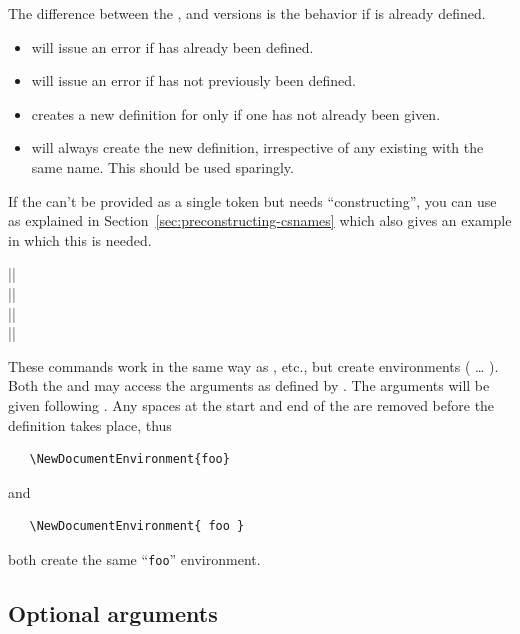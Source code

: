 \documentclass{ltxguide}
\begin{document}
The difference between the  , 
and  versions is the behavior if  is already
defined.
\begin{itemize}
 \item {} will issue an error if 
   has already been defined.
 \item {} will issue an error if 
   has not previously been defined.
 \item {} creates a new definition for
    only if one has not already been given.
 \item {} will always create the new
   definition, irrespective of any existing  with the
   same name.  This should be used sparingly.
\end{itemize}

If the  can't be provided as a single token but needs
\enquote{constructing}, you can use  as explained in
Section~\ref{sec:preconstructing-csnames} which also gives an example
in which this is needed.

\begin{decl}
  |\NewDocumentEnvironment|         \\
  |\RenewDocumentEnvironment|       \\
  |\ProvideDocumentEnvironment|     \\
  |\DeclareDocumentEnvironment|    
\end{decl}
These commands work in the same way as , etc.\@, but
create environments ( \ldots{}
). Both the  and 
may access the arguments as defined by . The arguments will be
given following . Any spaces at the start and end of the
 are removed before the definition takes place, thus
\begin{verbatim}
   \NewDocumentEnvironment{foo}
\end{verbatim}
and
\begin{verbatim}
   \NewDocumentEnvironment{ foo }
\end{verbatim}
both create the same \enquote{\texttt{foo}} environment.

\subsection{Optional arguments}
\label{sec:cmd:opt}
\end{document}
